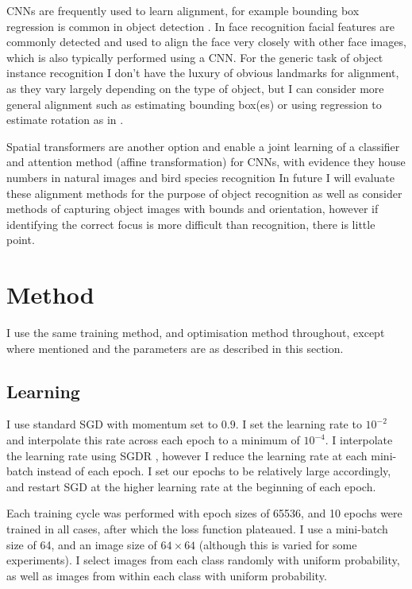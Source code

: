 \gls{CNN}s are frequently used to learn alignment, for example bounding box regression is common in object detection \cite{Sermanet2013}. In face recognition facial features are commonly detected and used to align the face very closely with other face images, which is also typically performed using a CNN. For the generic task of object instance recognition I don't have the luxury of obvious landmarks for alignment, as they vary largely depending on the type of object, but I can consider more general alignment such as estimating bounding box(es) or using regression to estimate rotation as in \cite {Fischer2015}. 

Spatial transformers \cite{Jaderberg2015} are another option and enable a joint learning of a classifier and attention method (affine transformation) for \gls{CNN}s, with evidence they  house numbers in natural images \cite{Netzer2011} and bird species recognition \cite{Wah2011} In future I will evaluate these alignment methods for the purpose of object recognition as well as consider methods of capturing object images with bounds and orientation, however if identifying the correct focus is more difficult than recognition, there is little point.


\section{Method}

I use the same training method, and optimisation method throughout, except where mentioned and the parameters are as described in this section. 

\subsection {Learning}

I use standard \gls{SGD} with momentum set to $ 0.9 $. I set the learning rate to $ 10^{-2} $ and interpolate this rate across each epoch to a minimum of $ 10^{-4} $. I interpolate the learning rate using \gls{SGDR}  \cite{Loshchilov2016}, however I reduce the learning rate at each mini-batch instead of each epoch. I set our epochs to be relatively large accordingly, and restart SGD at the higher learning rate at the beginning of each epoch. 

Each training cycle was performed with epoch sizes of 65536, and 10 epochs were trained in all cases, after which the loss function plateaued. I use a mini-batch size of 64, and an image size of $64\times64$ (although this is varied for some experiments). I select images from each class randomly with uniform probability, as well as images from within each class with uniform probability.

